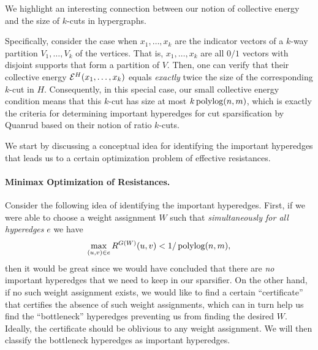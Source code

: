 \documentclass{article}
\begin{document}
\begin{remark}
    \label{rmk:kcut}
    We highlight an interesting connection between our notion
    of collective energy and the size of $k$-cuts in hypergraphs.
    
    Specifically, consider the case when
    $x_1,\ldots,x_k$ are the indicator vectors of
    a $k$-way partition $V_1,\ldots,V_k$ of the vertices.
    That is, $x_1,\ldots,x_k$ are all $0/1$ vectors with disjoint supports
    that form a partition of $V$.
    Then, one can verify that
    their collective energy
    $\mathcal{E}^H(x_1,\ldots,x_k)$ equals \textit{exactly}
    twice the size of the corresponding $k$-cut in $H$.
    Consequently, in this special case,
    our small collective energy condition means that 
    this $k$-cut has size at most $k\operatorname{polylog}(n,m)$,
    which is exactly the criteria for determining important
    hyperedges for cut sparsification
    by Quanrud \cite{Qua23} based on their notion of ratio $k$-cuts.
    
\end{remark}



We start by discussing a conceptual idea for identifying the important hyperedges
that leads us to a certain optimization problem of effective resistances.

\paragraph{Minimax Optimization of Resistances.}

Consider the following idea of identifying the important hyperedges.
First, if we were able to choose a weight assignment $W$ such that
\textit{simultaneously for all hyperedges} $e$
we have
\begin{align*}
    \max_{(u,v)\in e} R^{G(W)}(u,v) < 1 / \operatorname{polylog}(n,m),
\end{align*}
then it would be great since we would have concluded that there are \textit{no} important
hyperedges that we need to keep in our sparsifier.
On the other hand, if no such weight assignment exists, we would like to find a certain
``certificate'' that certifies the absence of such weight assignments, which can in turn help us find
the ``bottleneck'' hyperedges preventing us from finding the desired $W$.
Ideally, the certificate should be oblivious to any weight assignment.
We will then classify the bottleneck hyperedges as important hyperedges.
\end{document}
